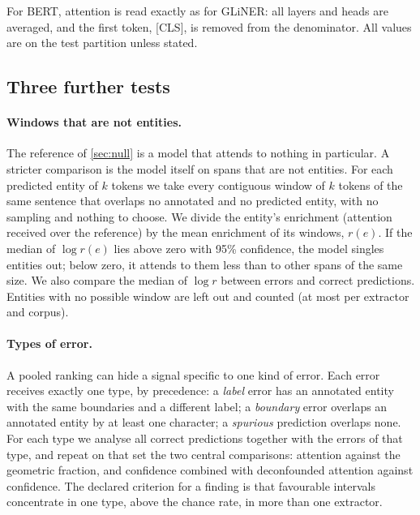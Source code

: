 \documentclass[11pt,a4paper]{article}
\newcommand{\gliner}{GLiNER}
\begin{document}
For BERT, attention is read exactly as for \gliner{}: all layers and heads are averaged, and the first token, [CLS], is
removed from the denominator. All values are on the test partition unless stated.

\subsection{Three further tests}
\label{sec:further}

\paragraph{Windows that are not entities.} The reference of \cref{sec:null} is a model that attends to nothing in
particular. A stricter comparison is the model itself on spans that are not entities. For each predicted entity of $k$ tokens
we take every contiguous window of $k$ tokens of the same sentence that overlaps no annotated and no predicted entity, with
no sampling and nothing to choose. We divide the entity's enrichment (attention received over the reference) by the mean
enrichment of its windows, $r(e)$. If the median of $\log r(e)$ lies above zero with 95\% confidence, the model singles
entities out; below zero, it attends to them less than to other spans of the same size. We also compare the median of
$\log r$ between errors and correct predictions. Entities with no possible window are left out and counted
(at most \winNoWindowMax{} per extractor and corpus).

\paragraph{Types of error.} A pooled ranking can hide a signal specific to one kind of error. Each error receives exactly one
type, by precedence: a \emph{label} error has an annotated entity with the same boundaries and a different label; a
\emph{boundary} error overlaps an annotated entity by at least one character; a \emph{spurious} prediction overlaps none. For
each type we analyse all correct predictions together with the errors of that type, and repeat on that set the two central
comparisons: attention against the geometric fraction, and confidence combined with deconfounded attention against confidence.
The declared criterion for a finding is that favourable intervals concentrate in one type, above the chance rate, in more than
one extractor.
\end{document}
